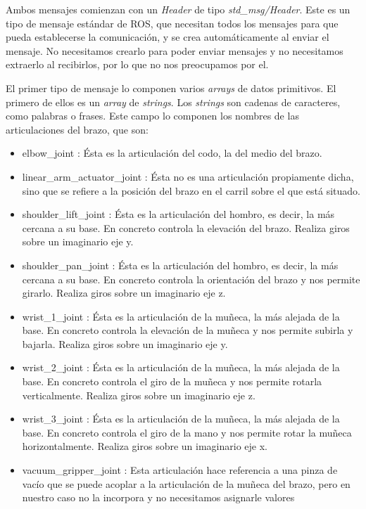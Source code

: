 Ambos mensajes comienzan con un \textit{Header} de tipo \textit{std\_msg/Header}. Este es un tipo de mensaje estándar de ROS, que necesitan todos los mensajes para que pueda establecerse la comunicación, y se crea automáticamente al enviar el mensaje. No necesitamos crearlo para poder enviar mensajes y no necesitamos extraerlo al recibirlos, por lo que no nos preocupamos por el.

El primer tipo de mensaje lo componen varios \textit{arrays} de datos primitivos. El primero de ellos es un \textit{array} de \textit{strings}. Los \textit{strings} son cadenas de caracteres, como palabras o frases. Este campo lo componen los nombres de las articulaciones del brazo, que son:
\begin{itemize}
	\item elbow\_joint : Ésta es la articulación del codo, la del medio del brazo.
	
	\item linear\_arm\_actuator\_joint : Ésta no es una articulación propiamente dicha, sino que se refiere a la posición del brazo en el carril sobre el que está situado.
	
	\item shoulder\_lift\_joint : Ésta es la articulación del hombro, es decir, la más cercana a su base. En concreto controla la elevación del brazo. Realiza giros sobre un imaginario eje y.
	
	\item shoulder\_pan\_joint : Ésta es la articulación del hombro, es decir, la más cercana a su base. En concreto controla la orientación del brazo y nos permite girarlo. Realiza giros sobre un imaginario eje z.
	
	\item wrist\_1\_joint : Ésta es la articulación de la muñeca, la más alejada de la base. En concreto controla la elevación de la muñeca y nos permite subirla y bajarla. Realiza giros sobre un imaginario eje y.
	
	\item wrist\_2\_joint : Ésta es la articulación de la muñeca, la más alejada de la base. En concreto controla el giro de la muñeca y nos permite rotarla verticalmente. Realiza giros sobre un imaginario eje z.
	
	\item wrist\_3\_joint : Ésta es la articulación de la muñeca, la más alejada de la base. En concreto controla el giro de la mano y nos permite rotar la muñeca horizontalmente. Realiza giros sobre un imaginario eje x.
	
	\item vacuum\_gripper\_joint : Esta articulación hace referencia a una pinza de vacío que se puede acoplar a la articulación de la muñeca del brazo, pero en nuestro caso no la incorpora y no necesitamos asignarle valores
\end{itemize}

